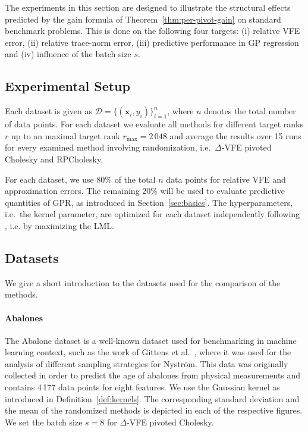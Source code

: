 \documentclass[onefignum,onetabnum]{siamart250211}
\begin{document}
The experiments in this section are designed to illustrate the structural effects predicted by the gain formula of Theorem~\ref{thm:per-pivot-gain} on standard benchmark problems. This is done on the following four targets: (i) relative VFE error, (ii) relative trace-norm error, (iii) predictive performance in GP regression and (iv) influence of the batch size $s$. 


\subsection{Experimental Setup}
Each dataset is given as $\mathcal{D} = \{(\bm{x}_i,y_i)\}_{i=1}^n$, where $n$ denotes the total number of data points. For each dataset we evaluate all methods for different target ranks $r$ up to an maximal target rank $r_{\text{max}}=2\,048$ and average the results over 15 runs for every examined method involving randomization, i.e.~$\Delta$-VFE pivoted Cholesky and RPCholesky.

For each dataset, we use 80\% of the total $n$ data points for relative VFE and approximation errors.  The remaining 20\% will be used to evaluate predictive quantities of GPR, as introduced in Section~\ref{sec:basics}. 
The  hyperparameters, i.e.~the kernel parameter, are optimized for each dataset independently following \cite[Section 5.2]{CarlEdwardRasmussenandChristopherK.I.Williams.}, i.e. by maximizing the LML.


\subsection{Datasets}
We give a short introduction to the datasets used for the comparison of the methods. 
\paragraph{Abalones}
The Abalone dataset \cite{abalone} is a well-known dataset used for benchmarking in machine learning context, such as the work of Gittens et al.~\cite{gittens.2013}, where it was used for the analysis of different sampling strategies for Nystr\"om. This data was originally collected in order to predict the age of abalones from physical measurements and contains 4\,177 data points for eight features. We use the Gaussian kernel as introduced in Definition~\ref{def:kernels}. The corresponding standard deviation and the mean of the randomized methods is depicted in each of the respective figures. We set the batch size $s=8$ for $\Delta$-VFE pivoted Cholesky. 
\end{document}
